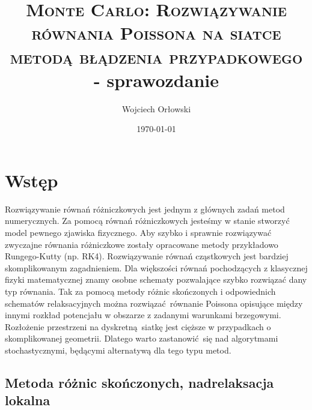 \documentclass[a4paper, 12pt]{article}
\author{Wojciech Orłowski}
\date{\today}
\title{\textsc{Monte Carlo: Rozwiązywanie równania Poissona na siatce metodą błądzenia przypadkowego}\\ - sprawozdanie}
\begin{document}
	\maketitle
	
	\section*{Wstęp}
	
	Rozwiązywanie równań różniczkowych jest jednym z głównych zadań metod numerycznych.
	Za pomocą równań różniczkowych jesteśmy w stanie stworzyć model pewnego zjawiska fizycznego.
	Aby szybko i sprawnie rozwiązywać zwyczajne równania różniczkowe zostały opracowane metody przykładowo Rungego-Kutty (np. RK4).
	Rozwiązywanie równań cząstkowych jest bardziej skomplikowanym zagadnieniem.
	Dla większości równań pochodzących z klasycznej fizyki matematycznej znamy osobne schematy pozwalające szybko rozwiązać dany typ równania.
	Tak za pomocą metody różnic skończonych i odpowiednich schematów relaksacyjnych można rozwiązać równanie Poissona opisujące między innymi rozkład potencjału w obszarze z zadanymi warunkami brzegowymi.
	Rozłożenie przestrzeni na dyskretną siatkę jest cięższe w przypadkach o skomplikowanej geometrii.
	Dlatego warto zastanowić się nad algorytmami stochastycznymi, będącymi alternatywą dla tego typu metod.
	
	\subsection*{Metoda różnic skończonych, nadrelaksacja lokalna}
	
\end{document}
